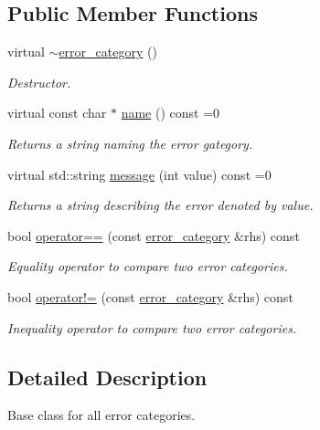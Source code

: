 \subsection*{Public Member Functions}
\begin{DoxyCompactItemize}
\item 
virtual \hyperlink{classasio_1_1error__category_a41c84cb6406a8dff3d4be56753a3666b}{$\sim$error\+\_\+category} ()
\begin{DoxyCompactList}\small\item\em Destructor. \end{DoxyCompactList}\item 
virtual const char $\ast$ \hyperlink{classasio_1_1error__category_a556b6099e1cc2d1cfb22e4ef2c9b0947}{name} () const  =0
\begin{DoxyCompactList}\small\item\em Returns a string naming the error gategory. \end{DoxyCompactList}\item 
virtual std\+::string \hyperlink{classasio_1_1error__category_a3c32370a4a84f685ac74eabc2d958821}{message} (int value) const  =0
\begin{DoxyCompactList}\small\item\em Returns a string describing the error denoted by {\ttfamily value}. \end{DoxyCompactList}\item 
bool \hyperlink{classasio_1_1error__category_ac00eda70261277c6192f154533c7a8ad}{operator==} (const \hyperlink{classasio_1_1error__category}{error\+\_\+category} \&rhs) const 
\begin{DoxyCompactList}\small\item\em Equality operator to compare two error categories. \end{DoxyCompactList}\item 
bool \hyperlink{classasio_1_1error__category_a09af7a7b74ab69daae9905f2460d97f8}{operator!=} (const \hyperlink{classasio_1_1error__category}{error\+\_\+category} \&rhs) const 
\begin{DoxyCompactList}\small\item\em Inequality operator to compare two error categories. \end{DoxyCompactList}\end{DoxyCompactItemize}


\subsection{Detailed Description}
Base class for all error categories. 

